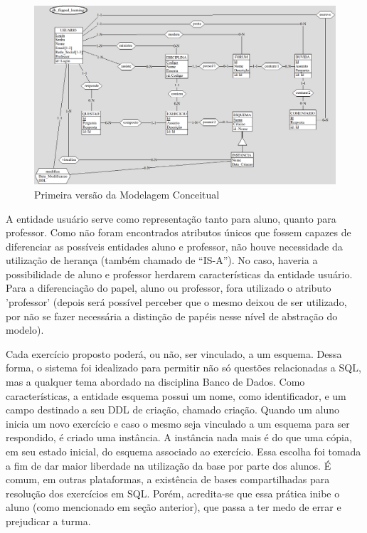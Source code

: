 \documentclass[graduacao,brazil]{ThesisPUC}
\begin{document}
\begin{figure}[H]
    \centering
    \includegraphics[width=\linewidth]{Imagens/ModelagemConceitual_v1_0.png}
    \caption{Primeira versão da Modelagem Conceitual}
\end{figure}

A entidade usu\'{a}rio serve como representa\c{c}\~{a}o tanto para aluno, quanto para professor.
Como n\~{a}o foram encontrados atributos \'{u}nicos que fossem capazes de diferenciar as poss\'{i}veis
entidades aluno e professor, n\~{a}o houve necessidade da utiliza\c{c}\~{a}o de heran\c{c}a (tamb\'{e}m chamado
de “IS-A”). No caso, haveria a possibilidade de aluno e professor herdarem caracter\'{i}sticas da
entidade usu\'{a}rio. Para a diferencia\c{c}\~{a}o do papel, aluno ou professor, fora utilizado o atributo
'professor' (depois ser\'{a} poss\'{i}vel perceber que o mesmo deixou de ser utilizado, por n\~{a}o se fazer
necess\'{a}ria a distin\c{c}\~{a}o de pap\'{e}is nesse n\'{i}vel de abstra\c{c}\~{a}o do modelo).

Cada exerc\'{i}cio proposto poder\'{a}, ou n\~{a}o, ser vinculado, a um esquema. Dessa forma, o
sistema foi idealizado para permitir n\~{a}o s\'{o} quest\~{o}es relacionadas a SQL, mas a qualquer tema
abordado na disciplina Banco de Dados. Como caracter\'{i}sticas, a entidade esquema possui um
nome, como identificador, e um campo destinado a seu DDL de cria\c{c}\~{a}o, chamado cria\c{c}\~{a}o.
Quando um aluno inicia um novo exerc\'{i}cio e caso o mesmo seja vinculado a um esquema
para ser respondido, \'{e} criado uma inst\^{a}ncia. A inst\^{a}ncia nada mais \'{e} do que uma c\'{o}pia, em seu
estado inicial, do esquema associado ao exerc\'{i}cio. Essa escolha foi tomada a fim de dar maior
liberdade na utiliza\c{c}\~{a}o da base por parte dos alunos. \'{E} comum, em outras plataformas, a
exist\^{e}ncia de bases compartilhadas para resolu\c{c}\~{a}o dos exerc\'{i}cios em SQL. Por\'{e}m, acredita-se
que essa pr\'{a}tica inibe o aluno (como mencionado em se\c{c}\~{a}o anterior), que passa a ter medo de
errar e prejudicar a turma.
\end{document}
